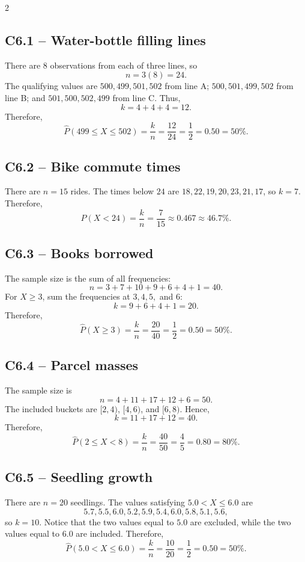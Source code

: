 \begin{multicols}{2}

	\subsection*{C6.1 -- Water-bottle filling lines}
	There are $8$ observations from each of three lines, so
	\[
		n=3(8)=24.
	\]
	The qualifying values are $500,499,501,502$ from line A;
	$500,501,499,502$ from line B; and $501,500,502,499$ from line C. Thus,
	\[
		k=4+4+4=12.
	\]
	Therefore,
	\[
		\widehat P(499\leq X\leq502)
		=\frac{k}{n}=\frac{12}{24}=\frac12=0.50=50\%.
	\]

	\subsection*{C6.2 -- Bike commute times}
	There are $n=15$ rides. The times below $24$ are
	$18,22,19,20,23,21,17$, so $k=7$. Therefore,
	\[
		\widehat P(X<24)
		=\frac{k}{n}=\frac{7}{15}\approx0.467\approx46.7\%.
	\]

	\subsection*{C6.3 -- Books borrowed}
	The sample size is the sum of all frequencies:
	\[
		n=3+7+10+9+6+4+1=40.
	\]
	For $X\geq3$, sum the frequencies at $3,4,5,$ and $6$:
	\[
		k=9+6+4+1=20.
	\]
	Therefore,
	\[
		\widehat P(X\geq3)
		=\frac{k}{n}=\frac{20}{40}=\frac12=0.50=50\%.
	\]

	\subsection*{C6.4 -- Parcel masses}
	The sample size is
	\[
		n=4+11+17+12+6=50.
	\]
	The included buckets are $[2,4)$, $[4,6)$, and $[6,8)$. Hence,
	\[
		k=11+17+12=40.
	\]
	Therefore,
	\[
		\widehat P(2\leq X<8)
		=\frac{k}{n}=\frac{40}{50}=\frac45=0.80=80\%.
	\]

	\subsection*{C6.5 -- Seedling growth}
	There are $n=20$ seedlings. The values satisfying $5.0<X\leq6.0$ are
	\[
		5.7,5.5,6.0,5.2,5.9,5.4,6.0,5.8,5.1,5.6,
	\]
	so $k=10$. Notice that the two values equal to $5.0$ are excluded, while
	the two values equal to $6.0$ are included. Therefore,
	\[
		\widehat P(5.0<X\leq6.0)
		=\frac{k}{n}=\frac{10}{20}=\frac12=0.50=50\%.
	\]


\end{multicols}
